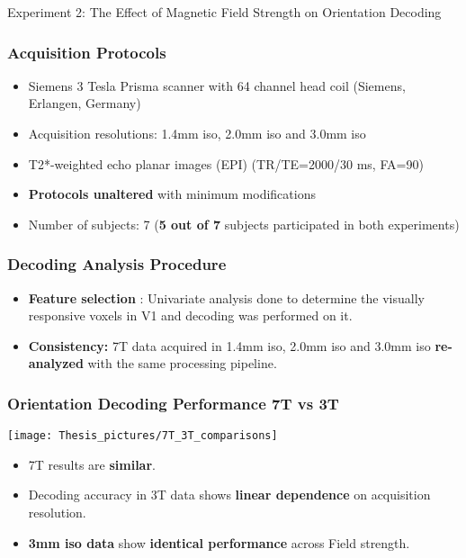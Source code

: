\documentclass{beamer}
\begin{document}
	\begin{frame}
		\begin{center}
			\Large Experiment 2: The Effect of Magnetic Field Strength on Orientation Decoding
		\end{center}
	\end{frame}




	\begin{frame}
		\frametitle{Acquisition Protocols}
		\begin{itemize}
		 \item Siemens 3 Tesla Prisma scanner with 64 channel head coil (Siemens, Erlangen, Germany)
		 \item Acquisition resolutions: 1.4mm iso, 2.0mm iso and 3.0mm iso
		 \item T2*-weighted echo planar images (EPI) (TR/TE=2000/30 ms, FA=90\textdegree)
		 \item \textbf{Protocols unaltered} with minimum modifications
		 \item Number of subjects: 7 (\textbf{5 out of 7} subjects participated in both experiments)
		\end{itemize}  
	\end{frame} 


  \begin{frame}
    \frametitle{Decoding Analysis Procedure}
		\begin{itemize}
		 \item \textbf{Feature selection} : Univariate analysis done to determine 
		 the visually responsive voxels in V1 and decoding was performed on it.
		 \item \textbf{Consistency:} 7T data acquired in 1.4mm iso, 2.0mm iso and 3.0mm iso \textbf{re-analyzed} 
		 with the same processing pipeline.
		\end{itemize}  
    \end{frame}


  \begin{frame}
    \frametitle{Orientation Decoding Performance 7T vs 3T}
        \begin{center}
            \texttt{[image: Thesis\_pictures/7T\_3T\_comparisons]}
        \end{center}
		\begin{itemize}
		 \item 7T results are \textbf{similar}.
		 \item Decoding accuracy in 3T data shows \textbf{linear dependence} on acquisition resolution.
		 \item \textbf{3mm iso data} show \textbf{identical performance} across Field strength.
		\end{itemize} 
    \end{frame}
\end{document}
